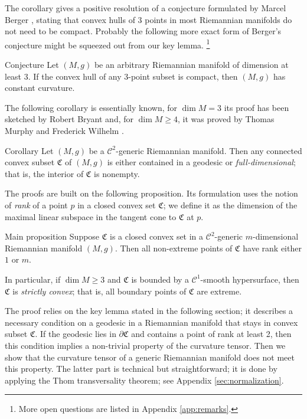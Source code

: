 \documentclass[a4paper,10pt]{article}
\begin{document}
The corollary gives a positive resolution of a conjecture formulated by Marcel Berger
\cite[Note 6.1.3.1]{berger-2003}, stating that convex hulls of $3$ points in most Riemannian manifolds do not need to be  compact.
Probably  the following more exact form of Berger's conjecture might be squeezed out from our key lemma.%
\footnote{More open questions are listed in  Appendix \ref{app:remarks}.}

\begin{thm}{Conjecture}  Let $(M,g)$ be an arbitrary Riemannian manifold of dimension at least 3.
If the convex hull of any 3-point subset is compact,
then $(M,g)$ has constant curvature.
\end{thm}

The following corollary is essentially known, for $\dim M=3$ its proof has been sketched by Robert Bryant \cite{Bryant} and, for $\dim M\geq 4$, it was proved by Thomas Murphy and Frederick Wilhelm \cite{Wilhelm}.

\begin{thm}{Corollary}\label{cor:main}
Let $(M,g)$ be a $\mathcal C^2$-generic Riemannian manifold.
Then any connected  convex subset $\mathfrak C$ of $(M,g)$ is either contained in a geodesic
or \emph{full-dimensional}; that is, the interior of $\mathfrak C$ is nonempty.
\end{thm}

The proofs are built on the following proposition.
Its formulation uses the notion of \emph{rank} of a point $p$ in a closed convex set $\mathfrak{C}$;
we define it as the dimension of the maximal linear subspace in the tangent cone to $\mathfrak{C}$ at $p$.

\begin{thm}{Main proposition}\label{prom:rank}
Suppose $\mathfrak{C}$ is a closed convex set in a $\mathcal C^2$-generic $m$-dimensional Riemannian manifold $(M,g)$.
Then all non-extreme points of $\mathfrak{C}$ have rank either $1$ or $m$.

In particular, if $\dim M\ge 3$ and $\mathfrak{C}$ is bounded by a $\mathcal{C}^1$-smooth hypersurface, then $\mathfrak{C}$ is \emph{strictly convex};
that is, all boundary points of $\mathfrak{C}$ are extreme.
\end{thm}


The proof relies on the key lemma stated in the following section;   
it describes a necessary condition on a geodesic in a Riemannian manifold that stays in convex subset $\mathfrak C$.
If the geodesic  lies in $\partial \mathfrak C$ and  contains a point of rank at least 2, then this condition implies a non-trivial
property  of the curvature tensor.
Then we show that the curvature tensor of a generic Riemannian manifold does not meet this property.
The latter part is technical but straightforward; it is done by applying the Thom transversality theorem; see Appendix \ref{sec:normalization}.
\end{document}
